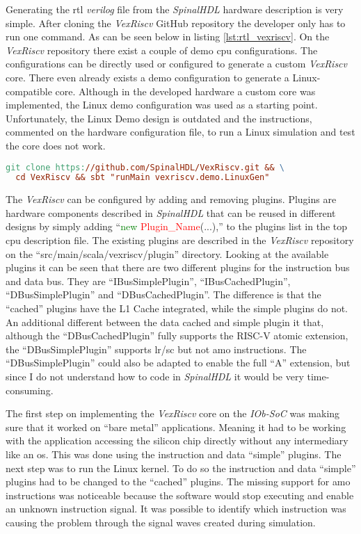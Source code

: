 Generating the \acrshort{rtl} \textit{verilog} file from the \textit{SpinalHDL} hardware description is very simple. After cloning the \textit{VexRiscv} GitHub repository the developer only has to run one command. As can be seen below in listing \ref{lst:rtl_vexriscv}. On the \textit{VexRiscv} repository there exist a couple of demo \acrshort{cpu} configurations. The configurations can be directly used or configured to generate a custom \textit{VexRiscv} core. There even already exists a demo configuration to generate a Linux-compatible core. Although in the developed hardware a custom core was implemented, the Linux demo configuration was used as a starting point. Unfortunately, the Linux Demo design is outdated and the instructions, commented on the hardware configuration file, to run a Linux simulation and test the core does not work.

\begin{lstlisting}[language=make, caption={Generate \textit{verilog} from \textit{SpinalHDL}}, label=lst:rtl_vexriscv]
git clone https://github.com/SpinalHDL/VexRiscv.git && \
  cd VexRiscv && sbt "runMain vexriscv.demo.LinuxGen"
\end{lstlisting}

The \textit{VexRiscv} can be configured by adding and removing plugins. Plugins are hardware components described in \textit{SpinalHDL} that can be reused in different designs by simply adding \enquote{\textcolor{green}{new} \textcolor{red}{Plugin\_Name}(...),} to the plugins list in the top \acrshort{cpu} description file. The existing plugins are described in the \textit{VexRiscv} repository on the \enquote{src/main/scala/vexriscv/plugin} directory. Looking at the available plugins it can be seen that there are two different plugins for the instruction bus and data bus. They are \enquote{IBusSimplePlugin}, \enquote{IBusCachedPlugin}, \enquote{DBusSimplePlugin} and \enquote{DBusCachedPlugin}. The difference is that the \enquote{cached} plugins have the L1 Cache integrated, while the simple plugins do not. An additional different between the data cached and simple plugin it that, although the \enquote{DBusCachedPlugin} fully supports the RISC-V atomic extension, the \enquote{DBusSimplePlugin} supports \acrfull{lr}/\acrfull{sc} but not \acrfull{amo} instructions. The \enquote{DBusSimplePlugin} could also be adapted to enable the full \enquote{A} extension, but since I do not understand how to code in \textit{SpinalHDL} it would be very time-consuming.

The first step on implementing the \textit{VexRiscv} core on the \textit{IOb-SoC} was making sure that it worked on \enquote{bare metal} applications. Meaning it had to be working with the application accessing the silicon chip directly without any intermediary like an \acrfull{os}. This was done using the instruction and data \enquote{simple} plugins. The next step was to run the Linux kernel. To do so the instruction and data \enquote{simple} plugins had to be changed to the \enquote{cached} plugins. The missing support for \acrfull{amo} instructions was noticeable because the software would stop executing and enable an unknown instruction signal. It was possible to identify which instruction was causing the problem through the signal waves created during simulation.

